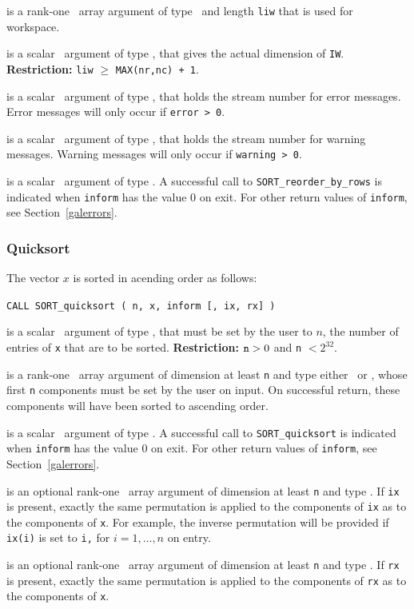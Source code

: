 \documentclass{galahad}
\newcommand{\packagename}{SORT}
\begin{document}
\begin{description}
  is a rank-one \intentout\ array argument of type
\integer\ and length {\tt liw} that is used for workspace.

  is a scalar \intentin\ argument of type
\integer, that gives the actual dimension of {\tt IW}.
{\bf Restriction:} {\tt liw} $\geq$ {\tt MAX(nr,nc) + 1}.

 is a scalar \intentin\ argument of type
\integer, that holds the stream number for error messages.
Error messages will only occur if {\tt error > 0}.

 is a scalar \intentin\ argument of type
\integer, that holds the stream number for warning messages.
Warning messages will only occur if {\tt warning > 0}.

 is a scalar \intentout\ argument of type \integer.
A successful call to {\tt \packagename\_reorder\_by\_rows}
is indicated when {\tt inform} has the value 0 on exit.
For other return values of {\tt inform}, see Section~\ref{galerrors}.

\end{description}

\subsubsection{Quicksort}

The vector $x$ is sorted in acending order as follows:
\vspace*{1mm}

\hspace{8mm}
{\tt CALL \packagename\_quicksort ( n, x, inform [, ix, rx] )}

\begin{description}
 is a scalar \intentin\ argument of type
\integer, that must be set by the user to $n$, the
number of entries of {\tt x} that are to be sorted.
{\bf Restriction:} ${\tt n} > 0$  and {\tt n} $< 2^{32}$.

 is a rank-one \intentinout\ array argument of
dimension at least {\tt n} and type either
\integer\ or \realdp, whose first {\tt n} components must be set by
the user on input. On successful return, these components will have
been sorted to ascending order.

 is a scalar \intentout\ argument of type \integer.
A successful call to {\tt \packagename\_quicksort}
is indicated when {\tt inform} has the value 0 on exit.
For other return values of {\tt inform}, see Section~\ref{galerrors}.

 is an optional rank-one \intentinout\ array argument of
dimension at least {\tt n} and type \integer.
If {\tt ix} is present, exactly the same permutation is applied to the
components of {\tt ix} as to the components of {\tt x}.
For example, the inverse permutation will be provided if {\tt ix(i)} is set to
{\tt i,} for $i = 1, \ldots, n$ on entry.

 is an optional rank-one \intentinout\ array argument of
dimension at least {\tt n} and type \realdp.
If {\tt rx} is present, exactly the same permutation is applied to the
components of {\tt rx} as to the components of {\tt x}.

\end{description}
\end{document}
